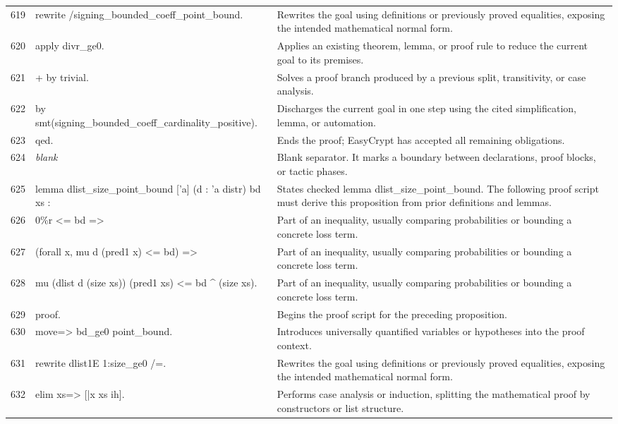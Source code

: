 \documentclass[10pt]{article}
\begin{document}
\begin{longtable}{r L{0.53\textwidth} L{0.37\textwidth}}
619 & {\ttfamily\scriptsize rewrite /signing\_bounded\_coeff\_point\_bound.} & Rewrites the goal using definitions or previously proved equalities, exposing the intended mathematical normal form. \\
620 & {\ttfamily\scriptsize apply divr\_ge0.} & Applies an existing theorem, lemma, or proof rule to reduce the current goal to its premises. \\
621 & {\ttfamily\scriptsize + by trivial.} & Solves a proof branch produced by a previous split, transitivity, or case analysis. \\
622 & {\ttfamily\scriptsize by smt(signing\_bounded\_coeff\_cardinality\_positive).} & Discharges the current goal in one step using the cited simplification, lemma, or automation. \\
623 & {\ttfamily\scriptsize qed.} & Ends the proof; EasyCrypt has accepted all remaining obligations. \\
624 & {\ttfamily\scriptsize \emph{blank}} & Blank separator.  It marks a boundary between declarations, proof blocks, or tactic phases. \\
625 & {\ttfamily\scriptsize lemma dlist\_size\_point\_bound ['a] (d : 'a distr) bd xs :} & States checked lemma dlist\_size\_point\_bound.  The following proof script must derive this proposition from prior definitions and lemmas. \\
626 & {\ttfamily\scriptsize   0\%r <= bd =>} & Part of an inequality, usually comparing probabilities or bounding a concrete loss term. \\
627 & {\ttfamily\scriptsize   (forall x, mu d (pred1 x) <= bd) =>} & Part of an inequality, usually comparing probabilities or bounding a concrete loss term. \\
628 & {\ttfamily\scriptsize   mu (dlist d (size xs)) (pred1 xs) <= bd \textasciicircum{} (size xs).} & Part of an inequality, usually comparing probabilities or bounding a concrete loss term. \\
629 & {\ttfamily\scriptsize proof.} & Begins the proof script for the preceding proposition. \\
630 & {\ttfamily\scriptsize move=> bd\_ge0 point\_bound.} & Introduces universally quantified variables or hypotheses into the proof context. \\
631 & {\ttfamily\scriptsize rewrite dlist1E 1:size\_ge0 /=.} & Rewrites the goal using definitions or previously proved equalities, exposing the intended mathematical normal form. \\
632 & {\ttfamily\scriptsize elim xs=> [|x xs ih].} & Performs case analysis or induction, splitting the mathematical proof by constructors or list structure. \\

\end{longtable}
\end{document}
